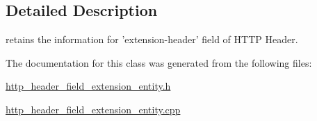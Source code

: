 \subsection{Detailed Description}
retains the information for 'extension-\/header' field of H\-T\-T\-P Header. 

The documentation for this class was generated from the following files\-:\begin{DoxyCompactItemize}
\item 
\hyperlink{http__header__field__extension__entity_8h}{http\-\_\-header\-\_\-field\-\_\-extension\-\_\-entity.\-h}\item 
\hyperlink{http__header__field__extension__entity_8cpp}{http\-\_\-header\-\_\-field\-\_\-extension\-\_\-entity.\-cpp}\end{DoxyCompactItemize}
